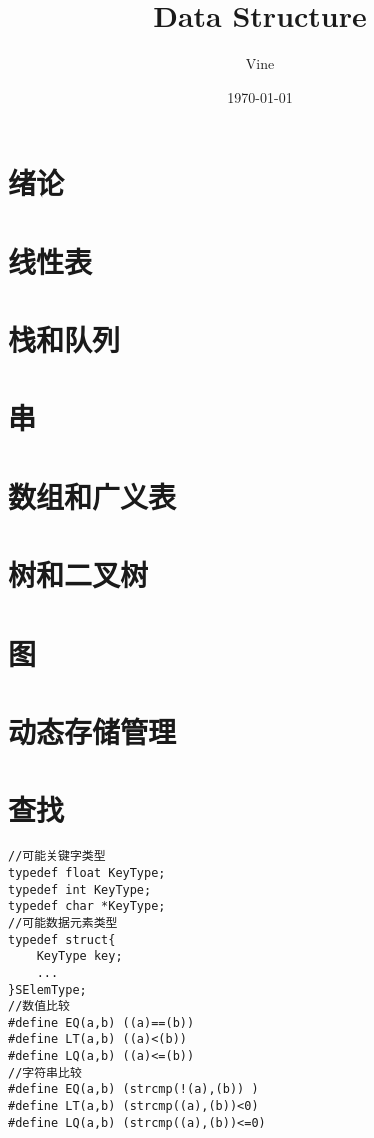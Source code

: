 \documentclass[UTF8]{ctexart}
\title{Data Structure}
\author{Vine}
\date{\today}
\begin{document}
    

\setlength{\headheight}{15pt}
\maketitle %
\newpage
\tableofcontents{}

\newpage
\section{绪论}
\newpage
\section{线性表}
\newpage
\section{栈和队列}
\newpage
\section{串}
\newpage
\section{数组和广义表}
\newpage
\section{树和二叉树}
\newpage
\section{图}
\newpage
\section{动态存储管理}



\newpage
\section{查找}
\begin{lstlisting}[style=v1]
//可能关键字类型
typedef float KeyType;
typedef int KeyType;
typedef char *KeyType;
//可能数据元素类型
typedef struct{
    KeyType key;
    ...
}SElemType;
//数值比较
#define EQ(a,b) ((a)==(b))
#define LT(a,b) ((a)<(b))
#define LQ(a,b) ((a)<=(b))
//字符串比较
#define EQ(a,b) (strcmp(!(a),(b)) )
#define LT(a,b) (strcmp((a),(b))<0)
#define LQ(a,b) (strcmp((a),(b))<=0)

\end{lstlisting}
\end{document}
